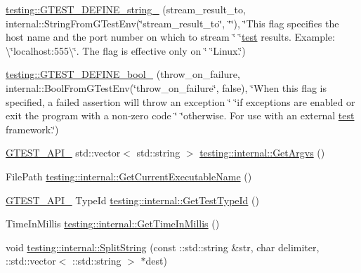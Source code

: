 \begin{DoxyCompactItemize}
\item 
\mbox{\hyperlink{namespacetesting_a5cfe9778e1cc8b5cf04bfe9e764ddff6}{testing\+::\+G\+T\+E\+S\+T\+\_\+\+D\+E\+F\+I\+N\+E\+\_\+string\+\_\+}} (stream\+\_\+result\+\_\+to, internal\+::\+String\+From\+G\+Test\+Env(\char`\"{}stream\+\_\+result\+\_\+to\char`\"{}, \char`\"{}\char`\"{}), \char`\"{}This flag specifies the host name and the port number on which to stream \char`\"{} \char`\"{}\mbox{\hyperlink{_mutual_8h_a707ee03719e99670bf6cfdfd897b8456}{test}} results. Example\+: \textbackslash{}\char`\"{}localhost\+:555\textbackslash{}\char`\"{}. The flag is effective only on \char`\"{} \char`\"{}Linux.\char`\"{})
\item 
\mbox{\hyperlink{namespacetesting_a2850b20fc3080527fae82aa170ef9aa5}{testing\+::\+G\+T\+E\+S\+T\+\_\+\+D\+E\+F\+I\+N\+E\+\_\+bool\+\_\+}} (throw\+\_\+on\+\_\+failure, internal\+::\+Bool\+From\+G\+Test\+Env(\char`\"{}throw\+\_\+on\+\_\+failure\char`\"{}, false), \char`\"{}When this flag is specified, a failed assertion will throw an exception \char`\"{} \char`\"{}if exceptions are enabled or exit the program with a non-\/zero code \char`\"{} \char`\"{}otherwise. For use with an external \mbox{\hyperlink{_mutual_8h_a707ee03719e99670bf6cfdfd897b8456}{test}} framework.\char`\"{})
\item 
\mbox{\hyperlink{_obj__test_2lib_2googletest-release-1_88_81_2googletest_2include_2gtest_2internal_2gtest-port_8h_aa73be6f0ba4a7456180a94904ce17790}{G\+T\+E\+S\+T\+\_\+\+A\+P\+I\+\_\+}} std\+::vector$<$ std\+::string $>$ \mbox{\hyperlink{namespacetesting_1_1internal_a9608256c67f889006be44912e57e3d4f}{testing\+::internal\+::\+Get\+Argvs}} ()
\item 
File\+Path \mbox{\hyperlink{namespacetesting_1_1internal_a7a2bbf069f75bc99873976ad6fc356ad}{testing\+::internal\+::\+Get\+Current\+Executable\+Name}} ()
\item 
\mbox{\hyperlink{_obj__test_2lib_2googletest-release-1_88_81_2googletest_2include_2gtest_2internal_2gtest-port_8h_aa73be6f0ba4a7456180a94904ce17790}{G\+T\+E\+S\+T\+\_\+\+A\+P\+I\+\_\+}} Type\+Id \mbox{\hyperlink{namespacetesting_1_1internal_ad0d66d56ead224263cd100c1d6bfc562}{testing\+::internal\+::\+Get\+Test\+Type\+Id}} ()
\item 
Time\+In\+Millis \mbox{\hyperlink{namespacetesting_1_1internal_ae66b46943a429e6efb1db456d4cae90c}{testing\+::internal\+::\+Get\+Time\+In\+Millis}} ()
\item 
void \mbox{\hyperlink{namespacetesting_1_1internal_a8eb8eddf760375a490e007b20777ec56}{testing\+::internal\+::\+Split\+String}} (const \+::std\+::string \&str, char delimiter, \+::std\+::vector$<$ \+::std\+::string $>$ $\ast$dest)

\end{DoxyCompactItemize}
